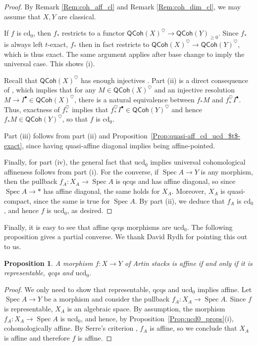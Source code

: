 \documentclass[a4paper,twoside,11pt]{amsart}
\theoremstyle{plain}
\newtheorem{proposition}[theorem]{Proposition}
\theoremstyle{definition}
\theoremstyle{remark}
\numberwithin{equation}{section}
\newcommand{\cd}{\mathrm{cd}}
\newcommand{\ucd}{$\mathrm{ucd}_{0}$\xspace}
\renewcommand{\cd}{$\mathrm{cd}_{0}$\xspace}
\DeclareMathOperator{\Spec}{Spec} %
\newcommand{\QCoh}{\mathsf{QCoh}}
\begin{document}
\begin{proof}
    By Remark \ref{Rem:coh_aff_cl} and Remark \ref{Rem:coh_dim_cl}, we may assume that $X,Y$ are classical.

    If $f$ is \cd, then $f_*$ restricts to a functor $\QCoh(X)^{\heartsuit} \to \QCoh(Y)_{\geq 0}$. Since $f_*$ is always left $t$-exact, $f_*$ then in fact restricts to $\QCoh(X)^{\heartsuit} \to \QCoh(Y)^{\heartsuit}$, which is thus exact. The same argument applies after base change to imply the universal case. This shows (i).
    
    Recall that $\QCoh(X)^\heartsuit$ has enough injectives \cite[\href{https://stacks.math.columbia.edu/tag/0781}{Tag 0781}]{stacks-project}. Part (ii) is a direct consequence of \cite[Lem.~C.3]{HallNeemanRydh}, which implies that for any $M \in \QCoh(X)^{\heartsuit}$ and an injective resolution $M \to I^\bullet \in \QCoh(X)^{\heartsuit}$, there is a natural equivalence between $f_\ast M$ and $f_\ast^{\heartsuit} I^\bullet$. Thus, exactness of $f_\ast^{\heartsuit}$ implies that $f_\ast^{\heartsuit} I^\bullet \in \QCoh(Y)^{\heartsuit}$ and hence $f_\ast M \in \QCoh(Y)^{\heartsuit}$, so that $f$ is \cd.

    Part (iii) follows from part (ii) and Proposition~\ref{Prop:quasi-aff_cd_ucd_$t$-exact}, since having quasi-affine diagonal implies being affine-pointed. 

    Finally, for part (iv), the general fact that \ucd implies universal cohomological affineness follows from part (i). For the converse, if $\Spec A \to Y$ is any morphism, then the pullback $f_A \colon X_A \to \Spec A$ is qcqs and has affine diagonal, so since $\Spec A \to \ast$ has affine diagonal, the same holds for $X_A$. Moreover, $X_A$ is quasi-compact, since the same is true for $\Spec A$. By part (ii), we deduce that $f_A$ is \cd, and hence $f$ is \ucd, as desired.
    \end{proof}

Finally, it is easy to see that affine qcqs morphisms are \ucd. The following proposition gives a partial converse. We thank David Rydh for pointing this out to us.

\begin{proposition} \label{prop:rep ucd qcqs implies affine}
    A morphism $f \colon X \to Y$ of Artin stacks is affine if and only if it is representable, qcqs and \ucd.
\end{proposition}

\begin{proof}
    We only need to show that representable, qcqs and \ucd implies affine. Let $\Spec A \to Y$ be a morphism and consider the pullback $f_A \colon X_A \to \Spec A$. Since $f$ is representable, $X_A$ is an algebraic space. By assumption, the morphism $f_A \colon X_A \to \Spec A$ is \ucd, and hence, by Proposition~\ref{Prop:ucd0_props}(i), cohomologically affine. By Serre's criterion \cite[Prop.~3.3]{AlperGood}, $f_A$ is affine, so we conclude that $X_A$ is affine and therefore $f$ is affine.
\end{proof}
\end{document}
